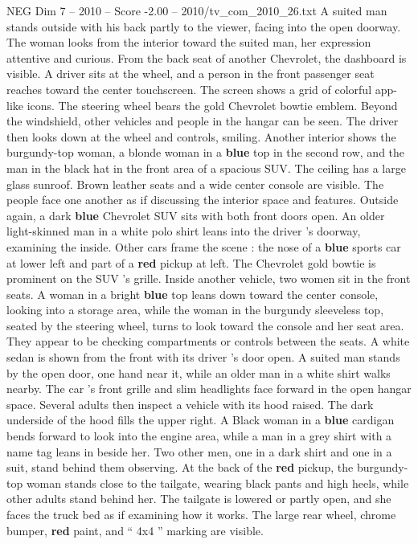 \begin{textsample}{NEG Dim 7 – 2010 – Score -2.00 – 2010/tv\_com\_2010\_26.txt}
A suited man stands outside with his back partly to the viewer, facing into the open doorway.
The woman looks from the interior toward the suited man, her expression attentive and curious.
From the back seat of another Chevrolet, the dashboard is visible.
A driver sits at the wheel, and a person in the front passenger seat reaches toward the center touchscreen.
The screen shows a grid of colorful app-like icons.
The steering wheel bears the gold Chevrolet bowtie emblem.
Beyond the windshield, other vehicles and people in the hangar can be seen.
The driver then looks down at the wheel and controls, smiling.
Another interior shows the burgundy-top woman, a blonde woman in a \textbf{blue} top in the second row, and the man in the black hat in the front area of a spacious SUV.
The ceiling has a large glass sunroof.
Brown leather seats and a wide center console are visible.
The people face one another as if discussing the interior space and features.
Outside again, a dark \textbf{blue} Chevrolet SUV sits with both front doors open.
An older light-skinned man in a white polo shirt leans into the driver ’s doorway, examining the inside.
Other cars frame the scene : the nose of a \textbf{blue} sports car at lower left and part of a \textbf{red} pickup at left.
The Chevrolet gold bowtie is prominent on the SUV ’s grille.
Inside another vehicle, two women sit in the front seats.
A woman in a bright \textbf{blue} top leans down toward the center console, looking into a storage area, while the woman in the burgundy sleeveless top, seated by the steering wheel, turns to look toward the console and her seat area.
They appear to be checking compartments or controls between the seats.
A white sedan is shown from the front with its driver ’s door open.
A suited man stands by the open door, one hand near it, while an older man in a white shirt walks nearby.
The car ’s front grille and slim headlights face forward in the open hangar space.
Several adults then inspect a vehicle with its hood raised.
The dark underside of the hood fills the upper right.
A Black woman in a \textbf{blue} cardigan bends forward to look into the engine area, while a man in a grey shirt with a name tag leans in beside her.
Two other men, one in a dark shirt and one in a suit, stand behind them observing.
At the back of the \textbf{red} pickup, the burgundy-top woman stands close to the tailgate, wearing black pants and high heels, while other adults stand behind her.
The tailgate is lowered or partly open, and she faces the truck bed as if examining how it works.
The large rear wheel, chrome bumper, \textbf{red} paint, and “ 4x4 ” marking are visible.

\end{textsample}

